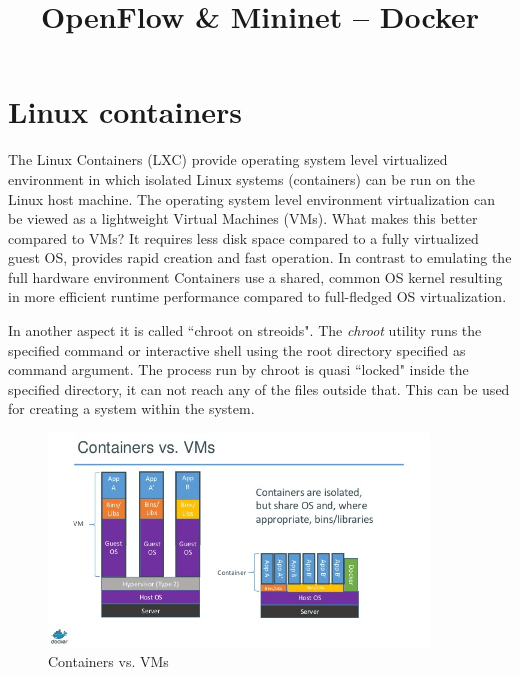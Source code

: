 \documentclass[a4paper]{article}
\title{OpenFlow \& Mininet – Docker}
\author{}
\date{}
\begin{document}
\maketitle

\tableofcontents

\section{Linux containers}
The Linux Containers (LXC) provide operating system level virtualized environment in which isolated Linux systems
(containers) can be run on the Linux host machine. The operating system level environment virtualization can be viewed
as a lightweight Virtual Machines (VMs). What makes this better compared to VMs? It requires less disk space compared
to a fully virtualized guest OS, provides rapid creation and fast operation. In contrast to emulating the full hardware
environment Containers use a shared, common OS kernel resulting in more efficient runtime performance compared to
full-fledged OS virtualization.

In another aspect it is called ``chroot on streoids". The \emph{chroot} utility runs the specified command or
interactive shell using the root directory specified as command argument. The process run by chroot is quasi ``locked"
inside the specified directory, it can not reach any of the files outside that. This can be used for creating a system
within the system.

\begin{figure}[H]
    \centering
    \includegraphics[width=0.9\textwidth]{figures/container_vs_vm.png}
    \caption{Containers vs. VMs}
    \label{fig:containers}
\end{figure}
\end{document}

